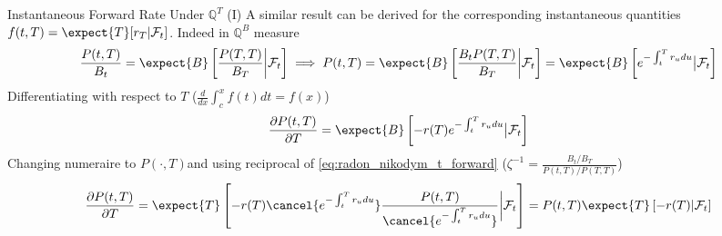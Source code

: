 \documentclass{beamer}
\begin{document}
\begin{frame}{Instantaneous Forward Rate Under $\mathbb{Q}^T$ (I)}
	A similar result can be derived for the corresponding instantaneous quantities
	$f(t,T)=\expect{T}[r_T|\mathcal{F}_t]$. Indeed in $\mathbb{Q}^B$ measure
	\begin{equation*}
		\frac{P(t,T)}{B_t}=\expect{B}\left[\frac{P(T,T)}{B_T}\bigg|\mathcal{F}_t\right] \implies
		P(t,T)=\expect{B}\left[\frac{B_tP(T,T)}{B_T}\bigg|\mathcal{F}_t\right]=\expect{B}\left[e^{-\int_t^Tr_u du}\big|\mathcal{F}_t\right]
	\end{equation*}
	Differentiating with respect to $T$ ($\frac{d}{dx}\int_c^x f(t)dt=f(x)$)
	\begin{equation*}
		\frac{\partial P(t,T)}{\partial T}=
		\expect{B}\left[-r(T)e^{-\int_t^Tr_u du}\big|\mathcal{F}_t\right]
	\end{equation*}
	Changing numeraire to $P(\cdot,T)$and using reciprocal of \cref{eq:radon_nikodym_t_forward} ($\zeta^{-1}=\frac{B_t/B_T}{P(t,T)/P(T,T)}$)
	\begin{equation*}
		\frac{\partial P(t,T)}{\partial T}=
		\expect{T}\left[-r(T)\cancel{e^{-\int_t^Tr_u du}}\frac{P(t,T)}{\cancel{e^{-\int_t^Tr_u du}}}\bigg|\mathcal{F}_t\right]=
		P(t,T)\expect{T}\left[-r(T)|\mathcal{F}_t\right]
	\end{equation*}
\end{frame}
\end{document}
